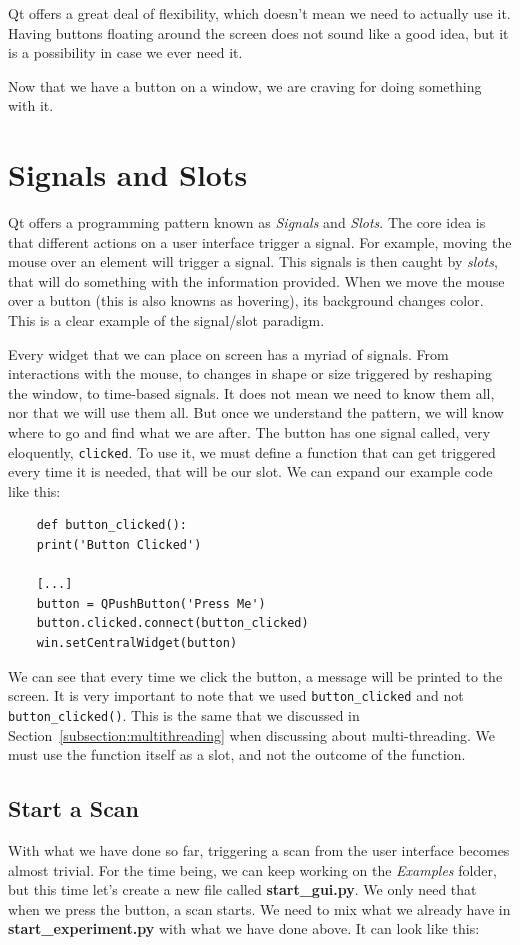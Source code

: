 Qt offers a great deal of flexibility, which doesn't mean we need to actually use it. Having buttons floating around the screen does not sound like a good idea, but it is a possibility in case we ever need it.

Now that we have a button on a window, we are craving for doing something with it.


\section{Signals and Slots}\label{sec:signals-slots}
Qt offers a programming pattern known as \emph{Signals} and \emph{Slots}. The core idea is that different actions on a user interface trigger a signal. For example, moving the mouse over an element will trigger a signal. This signals is then caught by \emph{slots}, that will do something with the information provided. When we move the mouse over a button (this is also knowns as hovering), its background changes color. This is a clear example of the signal/slot paradigm.

Every widget that we can place on screen has a myriad of signals. From interactions with the mouse, to changes in shape or size triggered by reshaping the window, to time-based signals. It does not mean we need to know them all, nor that we will use them all. But once we understand the pattern, we will know where to go and find what we are after. The button has one signal called, very eloquently, \texttt{clicked}. To use it, we must define a function that can get triggered every time it is needed, that will be our slot. We can expand our example code like this:

\begin{verbatim}
    def button_clicked():
    print('Button Clicked')

    [...]
    button = QPushButton('Press Me')
    button.clicked.connect(button_clicked)
    win.setCentralWidget(button)
\end{verbatim}

We can see that every time we click the button, a message will be printed to the screen. It is very important to note that we used \texttt{button\_clicked} and not \texttt{button\_clicked()}. This is the same that we discussed in Section~\ref{subsection:multithreading} when discussing about multi-threading. We must use the function itself as a slot, and not the outcome of the function.

\subsection{Start a Scan}\label{subsec:start-scan-gui}
With what we have done so far, triggering a scan from the user interface becomes almost trivial. For the time being, we can keep working on the \emph{Examples} folder, but this time let's create a new file called \textbf{start\_gui.py}. We only need that when we press the button, a scan starts. We need to mix what we already have in \textbf{start\_experiment.py} with what we have done above. It can look like this:

